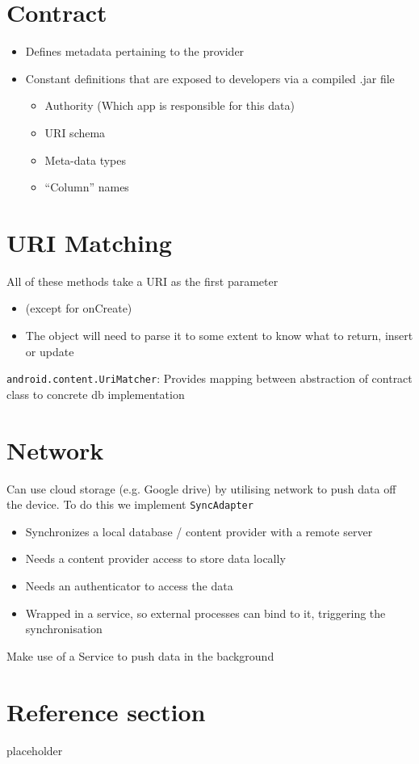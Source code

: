 \documentclass{article}
\begin{document}
\section{Contract}

\begin{itemize}
  \item Defines metadata pertaining to the provider
  \item Constant definitions that are exposed to developers via a compiled .jar file
  \begin{itemize}
    \item Authority (Which app is responsible for this data)
    \item URI schema
    \item Meta-data types 
    \item “Column” names
  \end{itemize}
\end{itemize}

\section{URI Matching}

\begin{flushleft}
All of these methods take a URI as the first parameter
\begin{itemize}
  \item (except for onCreate) 
  \item The object will need to parse it to some extent to know what to return, insert or update
\end{itemize}
\verb|android.content.UriMatcher|: Provides mapping between abstraction of contract class to concrete db implementation
\end{flushleft}

\section{Network}
\begin{flushleft}
Can use cloud storage (e.g. Google drive) by utilising network to push data off the device. To do this we implement \verb|SyncAdapter|
\begin{itemize}
  \item Synchronizes	a	local	database	/	content	provider	with	a	remote	server
  \item Needs a content provider access to store data locally
  \item Needs an authenticator to access the data
  \item Wrapped in a service, so external processes can bind to it, triggering the synchronisation
\end{itemize}
Make use of a Service to push data in the background
\end{flushleft}

\pagebreak
\section*{Reference section} \label{sec:reference}
\begin{description}
	\item[placeholder] \hfill \\
\end{description}
\end{document}
